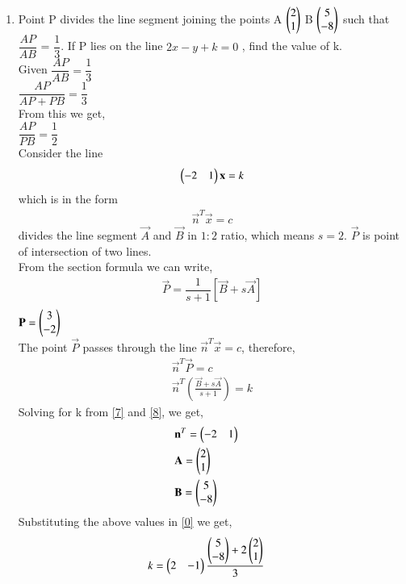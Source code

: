 \documentclass[journal,12pt,twocolumn]{IEEEtran}
\renewcommand\thesection{\arabic{section}}
\begin{document}
\begin{enumerate}[label=\thesection.\arabic*.,ref=\thesection.\theenumi]
\item Point P divides the line segment joining the points A $\begin{pmatrix}2 \\1\end{pmatrix}$ B $\begin{pmatrix}5 \\ -8\end{pmatrix}$ such that $\dfrac{AP}{AB}$ = $\dfrac{1}{3}$. If P lies on the line $2x-y+k = 0$ , find the value of k.\\
\solution Given $\dfrac{AP}{AB} =\dfrac{1}{3} $  \\
$\dfrac{AP}{AP+PB} =\dfrac{1}{3} $ \\


From this we get, \\
$\dfrac{AP}{PB} =\dfrac{1}{2} $\\

Consider the line  \begin{align}\begin{pmatrix}-2& 1\end{pmatrix}\mathbf{x}=k \label{7}\end{align} which is in the form 
\begin{align}\vec{n}^T\vec{x}=c \label{8} \end{align}
 divides the line segment $\vec{A}$ and $\vec{B} $ in $1:2$ ratio, which means $s = 2$. 
$\vec{P} $ is point of intersection of two lines.\\ 
From the section formula we can write,
\begin{align}
&\vec{P} = \dfrac{1}{s+1}\left[\vec{B}+ s\vec{A}\right]& \nonumber \\
 \end{align} 
$ \mathbf{P} = \begin{pmatrix}3 \\ -2\end{pmatrix}$ \\
The point $\vec{P}$ passes through the line $\vec{n}^T\vec{x}=c$, therefore,
\begin{align}
&\vec{n}^T\vec{P}=c& \nonumber\\
&\vec{n}^T\left(\displaystyle\frac{\vec{B}+s\vec{A}}{s+1} \right)=k& \label{0}
\end{align}
Solving for k from \eqref{7} and \eqref{8}, we get,
\begin{align}
& \mathbf{n}^T = \begin{pmatrix}-2&1\end{pmatrix}& \nonumber\\
& \mathbf{A} = \begin{pmatrix}2 \\1\end{pmatrix}& \nonumber\\
& \mathbf{B} = \begin{pmatrix}5\\-8\end{pmatrix} \nonumber
\end{align}
Substituting the above values in \eqref{0} we get,
\begin{align}
& k =\myvec{2 & -1}\dfrac{\myvec{5 \\ -8} + 2 \myvec{2 \\1}}{3} & \nonumber \\

\end{align}
\end{enumerate}
\end{document}
